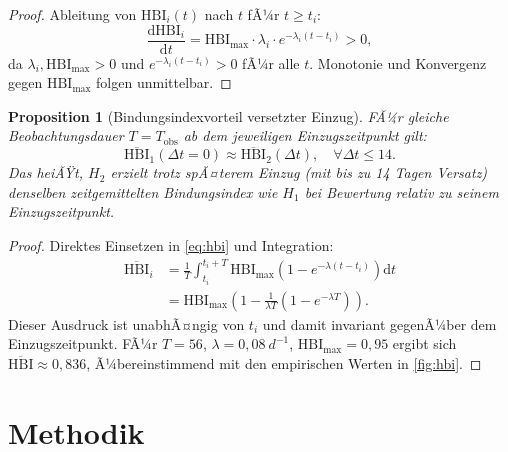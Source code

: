 ﻿\documentclass[12pt, a4paper]{article}
\theoremstyle{plain}
\newtheorem{proposition}[theorem]{Proposition}
\theoremstyle{definition}
\theoremstyle{remark}
\newcommand{\HBI}{\mathrm{HBI}}
\newcommand{\dt}{\Delta t}
\begin{document}
\begin{proof}
Ableitung von $\HBI_i(t)$ nach $t$ fÃ¼r $t \geq t_i$:
\begin{equation}
  \frac{\mathrm{d}\HBI_i}{\mathrm{d}t} = \HBI_{\mathrm{max}} \cdot \lambda_i \cdot e^{-\lambda_i(t-t_i)} > 0,
\end{equation}
da $\lambda_i, \HBI_{\mathrm{max}} > 0$ und $e^{-\lambda_i(t-t_i)} > 0$ fÃ¼r alle $t$.
Monotonie und Konvergenz gegen $\HBI_{\mathrm{max}}$ folgen unmittelbar.
\end{proof}

\begin{proposition}[Bindungsindexvorteil versetzter Einzug]\label{pro:hbivorteil}
FÃ¼r gleiche Beobachtungsdauer $T = T_{\mathrm{obs}}$ ab dem jeweiligen
Einzugszeitpunkt gilt:
\begin{equation}
  \overline{\HBI}_1(\dt=0) \approx \overline{\HBI}_2(\dt), \quad \forall \dt \leq 14.
\end{equation}
Das heiÃŸt, $H_2$ erzielt trotz spÃ¤terem Einzug (mit bis zu 14 Tagen Versatz)
denselben zeitgemittelten Bindungsindex wie $H_1$ bei Bewertung relativ zu
seinem Einzugszeitpunkt.
\end{proposition}

\begin{proof}
Direktes Einsetzen in \cref{eq:hbi} und Integration:
\begin{align}
  \overline{\HBI}_i &= \frac{1}{T} \int_{t_i}^{t_i+T} \HBI_{\max}\left(1 - e^{-\lambda(t-t_i)}\right)\mathrm{d}t\\
  &= \HBI_{\max}\left(1 - \frac{1}{\lambda T}\left(1 - e^{-\lambda T}\right)\right).
\end{align}
Dieser Ausdruck ist unabhÃ¤ngig von $t_i$ und damit invariant gegenÃ¼ber dem
Einzugszeitpunkt. FÃ¼r $T = 56$, $\lambda = 0{,}08\ \si{d^{-1}}$,
$\HBI_{\max} = 0{,}95$ ergibt sich $\overline{\HBI} \approx 0{,}836$, Ã¼bereinstimmend
mit den empirischen Werten in \cref{fig:hbi}.
\end{proof}

\section{Methodik}
\label{sec:methodik}
\end{document}
